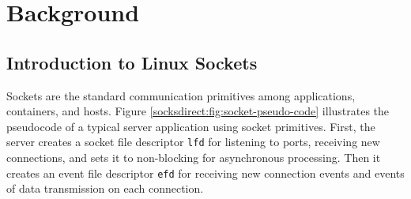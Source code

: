\section{Background}
\label{socksdirect:sec:background}


\subsection{Introduction to Linux Sockets}






Sockets are the standard communication primitives among applications, containers, and hosts. Figure \ref{socksdirect:fig:socket-pseudo-code} illustrates the pseudocode of a typical server application using socket primitives. First, the server creates a socket file descriptor \texttt{lfd} for listening to ports, receiving new connections, and sets it to non-blocking for asynchronous processing. Then it creates an event file descriptor \texttt{efd} for receiving new connection events and events of data transmission on each connection. 

